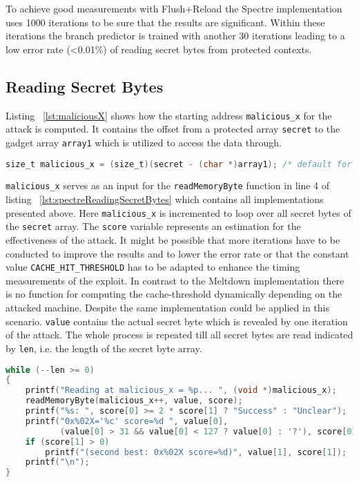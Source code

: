 \documentclass[a4paper,oneside,openright] {scrreprt}
\begin{document}
To achieve good measurements with Flush+Reload the Spectre implementation uses 1000 iterations to be sure that the results
are significant. Within these iterations the branch predictor is trained with another 30 iterations leading to a low error rate (<0.01\%)
of reading secret bytes from protected contexts.

\subsection{Reading Secret Bytes}
\label{ch:intro:motivation:A}

Listing ~\ref{lst:maliciousX} shows how the starting address \texttt{malicious\_x} for the attack is computed.
It contains the offset from a protected array \texttt{secret} to the gadget array \texttt{array1} 
which is utilized to access the data through.

\begin{lstlisting}[language=C, caption=Spectre: Malicious X, label={lst:maliciousX}]
size_t malicious_x = (size_t)(secret - (char *)array1); /* default for malicious_x */
\end{lstlisting}

\texttt{malicious\_x} serves as an input for the \texttt{readMemoryByte} function in line 4 of listing ~\ref{lst:spectreReadingSecretBytes} 
which contains all implementations presented above.
Here \texttt{malicious\_x} is incremented to loop over all secret bytes of the \texttt{secret} array.
The \texttt{score} variable represents an estimation for the effectiveness of the attack.
It might be possible that more iterations have to be conducted to improve the results and to lower the error rate
 or that the constant value \texttt{CACHE\_HIT\_THRESHOLD} has to be adapted to enhance the timing measurements of the exploit.
In contrast to the Meltdown implementation there is no function for computing the cache-threshold dynamically depending on the attacked machine.
Despite the same implementation could be applied in this scenario.
\texttt{value} contains the actual secret byte which is revealed by one iteration of the attack.
The whole process is repeated till all secret bytes are read indicated by \texttt{len}, i.e. the length of the secret byte array.

\begin{lstlisting}[language=C, caption=Spectre: Reading Secret Bytes, label={lst:spectreReadingSecretBytes}]
while (--len >= 0)
{
    printf("Reading at malicious_x = %p... ", (void *)malicious_x);
    readMemoryByte(malicious_x++, value, score);
    printf("%s: ", score[0] >= 2 * score[1] ? "Success" : "Unclear");
    printf("0x%02X='%c' score=%d ", value[0],
           (value[0] > 31 && value[0] < 127 ? value[0] : '?'), score[0]);
    if (score[1] > 0)
        printf("(second best: 0x%02X score=%d)", value[1], score[1]);
    printf("\n");
}
\end{lstlisting}
\end{document}
